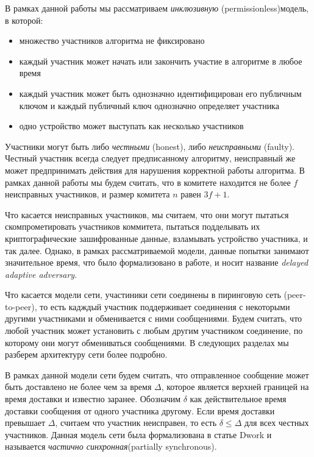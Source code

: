 В рамках данной работы мы рассматриваем \textit{инклюзивную} (permissionless)модель, в которой:
\begin{itemize}
\item множество участников алгоритма не фиксировано
\item каждый участник может начать или закончить участие в алгоритме в любое время
\item каждый участник может быть однозначно идентифицирован его публичным ключом и каждый публичный ключ однозначно определяет участника
\item одно устройство может выступать как несколько участников
\end{itemize}

Участники могут быть либо \textit{честными} (honest), либо \textit{неисправными} (faulty).  Честный участник всегда следует предписанному алгоритму, неисправный же может предпринимать действия для нарушения корректной работы алгоритма.
В рамках данной работы мы будем считать, что в комитете находится не более $f$ неисправных участников, и размер комитета $n$ равен $3f+1$.

Что касается неисправных участников, мы считаем, что они могут пытаться скомпрометировать участников коммитета, пытаться подделывать их криптографические зашифрованные данные, взламывать устройство участника, и так далее. Однако, в рамках рассматриваемой модели, данные попытки занимают значительное время, что было формализовано в работе\cite{hybrid-consensus}, и носит название \textit{delayed adaptive adversary}.

Что касается модели сети, участиники сети соединены в пиринговую сеть (peer-to-peer), 
то есть кадждый участник поддерживает соединения с некоторыми другими участниками и обменивается с ними сообщениями. Будем считать, что любой участник может установить с любым другим участником соединение, по которому они могут обмениваться сообщениями. В следующих разделах мы разберем архитектуру сети более подробно.

В рамках данной модели сети будем считать, что отправленное сообщение может быть доставлено не более чем за время $\Delta$, которое является верхней границей на время доставки и известно заранее.
Обозначим $\delta$ как действительное время доставки сообщения от одного участника другому. 
Если время доставки превышает $\Delta$, считаем что участник неисправен, 
то есть $\delta \le \Delta$ для всех честных участников. 
Данная модель сети была формализована в статье Dwork \cite{Dwork:1988:CPP:42282.42283} и называется \textit{частично синхронная}(partially synchronous).

